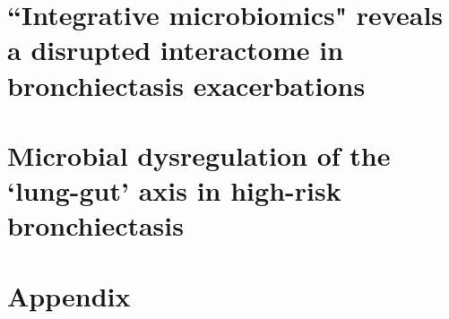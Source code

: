 \documentclass[10pt,a4paper]{report}
\begin{document}

\tableofcontents
\newpage
\listoffigures
\newpage
\listoftables
\newpage
\setcounter{page}{1}

%
\chapter{``Integrative microbiomics" reveals a disrupted interactome in bronchiectasis exacerbations}




\newpage
\chapter{Microbial dysregulation of the `lung-gut' axis in high-risk bronchiectasis}






\newpage
{}



\chapter{Appendix}


\end{document}
